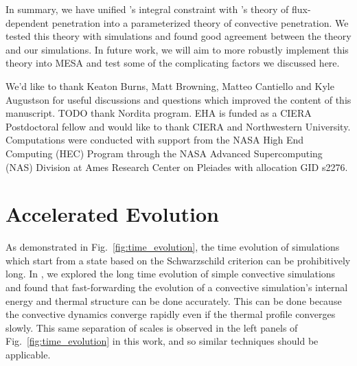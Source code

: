 \documentclass[twocolumn]{aastex631}
\begin{document}
In summary, we have unified \citet{roxburgh1989}'s integral constraint with \citet{zahn1991}'s theory of flux-dependent penetration into a parameterized theory of convective penetration.
We tested this theory with simulations and found good agreement between the theory and our simulations.
In future work, we will aim to more robustly implement this theory into MESA and test some of the complicating factors we discussed here.





\begin{acknowledgments}
We'd like to thank Keaton Burns, Matt Browning, Matteo Cantiello and Kyle Augustson for useful discussions and questions which improved the content of this manuscript.
TODO thank Nordita program.
EHA is funded as a CIERA Postdoctoral fellow and would like to thank CIERA and Northwestern University. 
Computations were conducted with support from the NASA High End Computing (HEC) Program through the NASA Advanced Supercomputing (NAS) Division at Ames Research Center on Pleiades with allocation GID s2276.
\end{acknowledgments}


\appendix

\section{Accelerated Evolution}
\label{app:accelerated_evolution}
As demonstrated in Fig.~\ref{fig:time_evolution}, the time evolution of simulations which start from a state based on the Schwarzschild criterion can be prohibitively long.
In \citet{anders_etal_2018}, we explored the long time evolution of simple convective simulations and found that fast-forwarding the evolution of a convective simulation's internal energy and thermal structure can be done accurately.
This can be done because the convective dynamics converge rapidly even if the thermal profile converges slowly.
This same separation of scales is observed in the left panels of Fig.~\ref{fig:time_evolution} in this work, and so similar techniques should be applicable.
\end{document}
